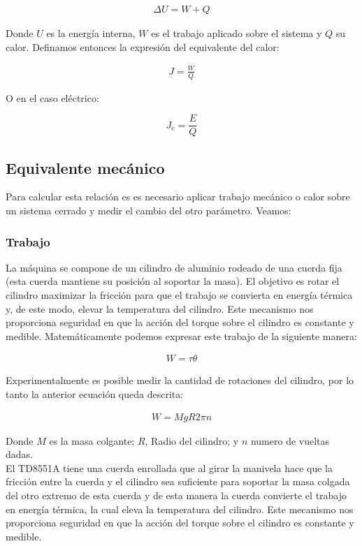 \documentclass{article}
\begin{document}
\begin{align}
    \Delta U = W + Q
\end{align}

Donde $U$ es la energía interna, $W$ es el trabajo aplicado sobre el sistema y $Q$ su calor. Definamos entonces la expresión del equivalente del calor:

\begin{align}
    J =  \frac{W}{Q}
\end{align}

O en el caso eléctrico:

\begin{equation}
    J_e=\frac{E}{Q}
\end{equation}

\subsection{Equivalente mecánico}
Para calcular esta relación es es necesario aplicar trabajo mecánico o calor sobre un sistema cerrado y medir el cambio del otro parámetro. Veamos:

\subsubsection{Trabajo}
La máquina se compone de un cilindro de aluminio rodeado de una cuerda fija (esta cuerda mantiene su posición al soportar la masa). El objetivo es rotar el cilindro maximizar la fricción para que el trabajo se convierta en energía térmica y, de este modo, elevar la temperatura del cilindro. Este mecanismo nos proporciona seguridad en que la acción del torque sobre el cilindro es constante y medible. Matemáticamente podemos expresar este trabajo de la siguiente manera: 

\begin{align}
    W = \tau \theta
\end{align}

Experimentalmente es posible medir la cantidad de rotaciones del cilindro, por lo tanto la anterior ecuación queda descrita: 

\begin{align}
    W = MgR2\pi n
    \label{eq:mecw}
\end{align}

Donde $M$ es la masa colgante; $R$, Radio del cilindro; y $n$ numero de vueltas dadas.\\

El  TD8551A tiene una cuerda enrollada que al girar la manivela hace que la fricción entre la cuerda y el cilindro sea suficiente para soportar la masa colgada del otro extremo de esta cuerda y de esta manera la cuerda convierte el trabajo en energía térmica, la cual eleva la temperatura del cilindro. Este mecanismo nos proporciona seguridad en que la acción del torque sobre el cilindro es constante y medible.
\end{document}
